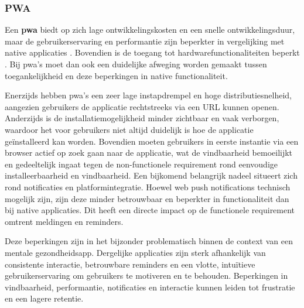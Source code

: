 \vspace{1em}

\subsubsection{PWA}
\label{subsubsec:pwa}

\vspace{1em}

Een \textbf{\acrshort{pwa}} biedt op zich lage ontwikkelingskosten en een snelle ontwikkelingsduur, maar de gebruikerservaring en performantie zijn beperkter in vergelijking met native applicaties \autocite{Samsyudin2025,Gerges2024}. Bovendien is de toegang tot hardwarefunctionaliteiten beperkt \autocite{Gerges2024}. Bij \acrshort{pwa}'s moet dan ook een duidelijke afweging worden gemaakt tussen toegankelijkheid en deze beperkingen in native functionaliteit.

\vspace{1em}

Enerzijds hebben \acrshort{pwa}'s een zeer lage instapdrempel en hoge distributiesnelheid, aangezien gebruikers de applicatie rechtstreeks via een URL kunnen openen. Anderzijds is de installatiemogelijkheid minder zichtbaar en vaak verborgen, waardoor het voor gebruikers niet altijd duidelijk is hoe de applicatie geïnstalleerd kan worden. Bovendien moeten gebruikers in eerste instantie via een browser actief op zoek gaan naar de applicatie, wat de vindbaarheid bemoeilijkt en gedeeltelijk ingaat tegen de non-functionele requirement rond eenvoudige installeerbaarheid en vindbaarheid. Een bijkomend belangrijk nadeel situeert zich rond notificaties en platformintegratie. Hoewel web push notifications technisch mogelijk zijn, zijn deze minder betrouwbaar en beperkter in functionaliteit dan bij native applicaties. Dit heeft een directe impact op de functionele requirement omtrent meldingen en reminders.

\vspace{1em}

Deze beperkingen zijn in het bijzonder problematisch binnen de context van een mentale gezondheidsapp. Dergelijke applicaties zijn sterk afhankelijk van consistente interactie, betrouwbare reminders en een vlotte, intuïtieve gebruikerservaring om gebruikers te motiveren en te behouden. Beperkingen in vindbaarheid, performantie, notificaties en interactie kunnen leiden tot frustratie en een lagere retentie.

\vspace{1em}

